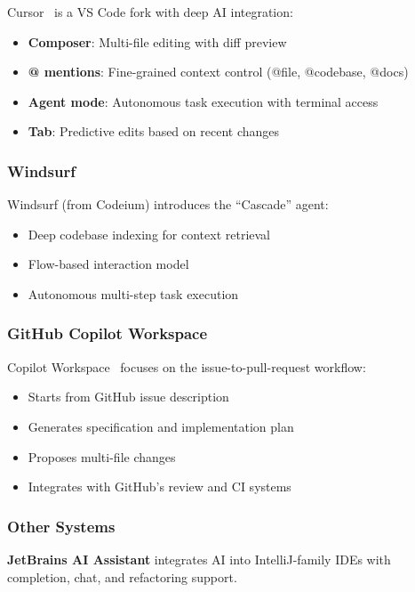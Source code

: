 Cursor~\citep{cursor2024} is a VS Code fork with deep AI integration:
\begin{itemize}
    \item \textbf{Composer}: Multi-file editing with diff preview
    \item \textbf{@ mentions}: Fine-grained context control (@file, @codebase, @docs)
    \item \textbf{Agent mode}: Autonomous task execution with terminal access
    \item \textbf{Tab}: Predictive edits based on recent changes
\end{itemize}

\subsubsection{Windsurf}

Windsurf (from Codeium) introduces the ``Cascade'' agent:
\begin{itemize}
    \item Deep codebase indexing for context retrieval
    \item Flow-based interaction model
    \item Autonomous multi-step task execution
\end{itemize}

\subsubsection{GitHub Copilot Workspace}

Copilot Workspace~\citep{github2024workspace} focuses on the issue-to-pull-request workflow:
\begin{itemize}
    \item Starts from GitHub issue description
    \item Generates specification and implementation plan
    \item Proposes multi-file changes
    \item Integrates with GitHub's review and CI systems
\end{itemize}

\subsubsection{Other Systems}

\textbf{JetBrains AI Assistant} integrates AI into IntelliJ-family IDEs with completion, chat, and refactoring support.

